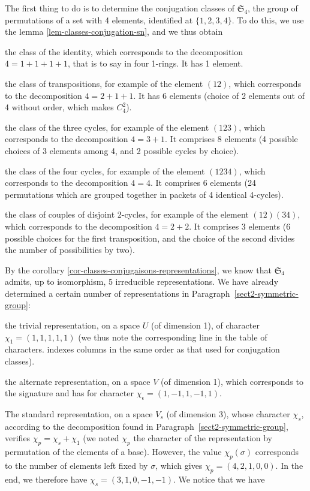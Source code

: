  
 The first thing to do is to determine the conjugation classes of $ \mathfrak{S}_4 $, the group of permutations of a set with 4 elements, identified at $ \{1,2,3,4\} $. To do this, we use the lemma \ref{lem-classes-conjugation-sn}, and we thus obtain \begin{rs}
\item the class of the identity, which corresponds to the decomposition $ 4 = 1 + 1 + 1 + 1 $, that is to say in four 1-rings. It has 1 element.
\item the class of transpositions, for example of the element $ (12) $, which corresponds to the decomposition $ 4 = 2 + 1 + 1 $. It has $ 6 $ elements (choice of 2 elements out of 4 without order, which makes $ C_4^2 $).
\item the class of the three cycles, for example of the element $ (123) $, which corresponds to the decomposition $ 4 = 3 + 1 $. It comprises $ 8 $ elements (4 possible choices of 3 elements among 4, and 2 possible cycles by choice).
\item the class of the four cycles, for example of the element $ (1234) $, which corresponds to the decomposition $ 4 = 4 $. It comprises $ 6 $ elements (24 permutations which are grouped together in packets of 4 identical 4-cycles).
\item the class of couples of disjoint 2-cycles, for example of the element $ (12) (34) $, which corresponds to the decomposition $ 4 = 2 + 2 $. It comprises $ 3 $ elements (6 possible choices for the first transposition, and the choice of the second divides the number of possibilities by two).
\end{rs} By the corollary \ref{cor-classes-conjugaisons-representations}, we know that $ \mathfrak{S}_4 $ admits, up to isomorphism, 5 irreducible representations. We have already determined a certain number of representations in Paragraph~\ref{sect2-symmetric-group}: \begin{rs}
\item the trivial representation, on a space $ U $ (of dimension 1), of character $ \chi_1 = (1,1,1,1,1) $ (we thus note the corresponding line in the table of characters. indexes columns in the same order as that used for conjugation classes).
\item the alternate representation, on a space $ V $ (of dimension 1), which corresponds to the signature and has for character $ \chi_{\epsilon} = (1, -1,1, -1,1) $.
\item The standard representation, on a space $ V_s $ (of dimension 3), whose character $ \chi_s $, according to the decomposition found in Paragraph~\ref{sect2-symmetric-group}, verifies $ \chi_p = \chi_{s} + \chi_1 $ (we noted $ \chi_{p} $ the character of the representation by permutation of the elements of a base). However, the value $ \chi_p (\sigma) $ corresponds to the number of elements left fixed by $ \sigma $, which gives $ \chi_p = (4,2,1,0,0) $. In the end, we therefore have $ \chi_s = (3,1,0, -1, -1) $. We notice that we have

\end{rs}

